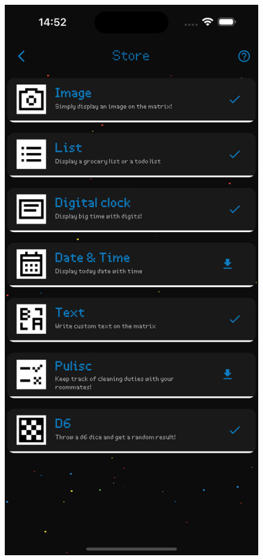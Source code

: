 \begin{figure}[h]
\begin{minipage}[b]{0.32\textwidth}
        \includegraphics[width=\textwidth]{tesi/img/client_demo/store/page.png}

\end{minipage}
\end{figure}
